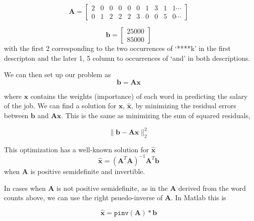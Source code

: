 \documentclass[12pt]{article}
\begin{document}
    \begin{equation*}
        \bm{A} = 
        \begin{bmatrix}
           2 & 0 & 0 & 0 & 0 & 0 & 1 & 3 & 1 & 1\cdots\\
	0 & 1 & 2 & 2 & 2 & 3 & 0 & 0 & 5 & 0\cdots
        \end{bmatrix}
    \end{equation*}
	
    \begin{equation*}
        \bm{b} = 
        \begin{bmatrix}
        25000\\
        85000
        \end{bmatrix}
    \end{equation*}
    with the first 2 corresponding to the two occurrences of `****k' in the first descripton and the later 1, 5 column to occurrences of `and' in both descriptions.


    We can then set up our problem as 
    \begin{equation}\label{eq:linsolve}
        \bm{b} = \bm{Ax}
    \end{equation}

    \noindent where $\bm{x}$ contains the weights (importance) of each word in
    predicting the salary of the job. We can find a solution for $\bm{x}$,
    $\bm{\hat{x}}$, by minimizing the residual errors between $\bm{b}$ and
    $\bm{Ax}$.  This is the same as minimizing the sum of squared residuals,

    \begin{equation}
        \|\bm{b} - \bm{Ax}\|^2_2
    \end{equation}

    \noindent This optimization has a well-known solution for $\bm{\hat{x}}$
    \begin{equation}
        \bm{\hat{x}} = (\bm{A}^{T}\bm{A})^{-1}\bm{A}^T\bm{b}
    \end{equation}
    when $\bm{A}$ is positive semidefinite and invertible.
    
    In cases when $\bm{A}$ is not positive semidefinite, as in the $\bm{A}$
    derived from the word counts above, we can use the right psuedo-inverse of
    $\bm{A}$.  In Matlab this is 
    
    \begin{equation} 
        \bm{\hat{x}} = \texttt{pinv}(\bm{A})*\bm{b}
    \end{equation}
\end{document}
